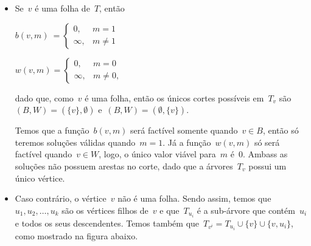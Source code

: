 \begin{itemize}
\item Se~$v$ é uma folha de~$T$, então

\bigskip

$ b(v,m)~ = 
\begin{cases}
	0, &m=1 \\
	\infty, &m\ne 1
\end{cases}$

\medskip

$w(v,m) = 
\begin{cases}
	0, &m=0 \\
	\infty, &m\ne 0,
\end{cases}$

dado que, como~$v$ é uma folha,
então os únicos
cortes possíveis em~$T_v$ são~${(B,W) = (\{v\},\emptyset)}$ 
e~${(B,W) = (\emptyset, \{v\})}$.

Temos que a função~$b(v,m)$ será factível somente 
quando~$v\in B$,
então só teremos soluções válidas quando~${m=1}$.
Já a função~$w(v,m)$ só será factível quando~$v\in W$,
logo, o único valor viável para~$m$ é~$0$.
Ambass as soluções não possuem arestas no corte, dado que
a árvores~$T_v$
possui um único vértice.

\item Caso contrário, o vértice~$v$ não é uma folha. 
Sendo assim, temos que~$u_1,u_2,\ldots,u_k$ são
os vértices filhos de~$v$ e 
que~$T_{u_i}$ é a sub-árvore que contém~$u_i$ e 
todos os seus descendentes.
Temos também que~${T_{v^i} = T_{u_i}\cup \{v\}\cup \{v,u_i\}} $,
como mostrado na figura abaixo.
	\begin{center} 
\end{center}
\end{itemize}
